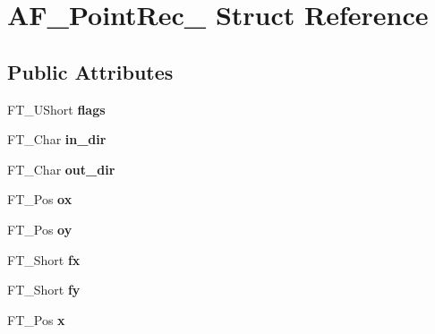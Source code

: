 \hypertarget{struct_a_f___point_rec__}{}\section{A\+F\+\_\+\+Point\+Rec\+\_\+ Struct Reference}
\label{struct_a_f___point_rec__}
\subsection*{Public Attributes}
\begin{DoxyCompactItemize}
\item 
\mbox{\label{struct_a_f___point_rec___ade9c4b603d4d6a0223b7b5efec75a321}} 
F\+T\+\_\+\+U\+Short {\bfseries flags}
\item 
\mbox{\label{struct_a_f___point_rec___a5e115d65c86dfe19eba72c61548e7ec7}} 
F\+T\+\_\+\+Char {\bfseries in\+\_\+dir}
\item 
\mbox{\label{struct_a_f___point_rec___ac53431765b8661b124353d4c1719a35f}} 
F\+T\+\_\+\+Char {\bfseries out\+\_\+dir}
\item 
\mbox{\label{struct_a_f___point_rec___abca603c976309cb4a1e11885461e6153}} 
F\+T\+\_\+\+Pos {\bfseries ox}
\item 
\mbox{\label{struct_a_f___point_rec___a2a646d297b1c64749f67bf70c05e053c}} 
F\+T\+\_\+\+Pos {\bfseries oy}
\item 
\mbox{\label{struct_a_f___point_rec___ac8cdf397386ea31a594ebdb041384125}} 
F\+T\+\_\+\+Short {\bfseries fx}
\item 
\mbox{\label{struct_a_f___point_rec___ab53e769ad21a201845f981f690de8878}} 
F\+T\+\_\+\+Short {\bfseries fy}
\item 
\mbox{\label{struct_a_f___point_rec___a6e7d497eb848230b6f517a2a5ffdbad2}} 
F\+T\+\_\+\+Pos {\bfseries x}
\item 
\mbox{\label{struct_a_f___point_rec___a4deaa8af957928bb5bc9d6aa9aeeb095}} 

\end{DoxyCompactItemize}
